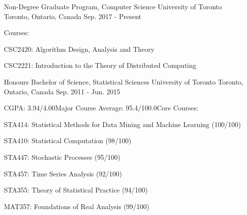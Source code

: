 
\begin{cventries}

  \cventry
    {Non-Degree Graduate Program, Computer Science} %
    {University of Toronto} %
    {Toronto, Ontario, Canada} %
    {Sep. 2017 - Present} %
    {Courses: \newline \hphantom{0}
      \begin{cvitems}
        \item {CSC2420: Algorithm Design, Analysis and Theory}
        \item {CSC2221: Introduction to the Theory of Distributed Computing}
      \end{cvitems}
    }
\end{cventries}
\begin{cventries}
  \cventry
    {Honours Bachelor of Science, Statistical Sciences} %
    {University of Toronto} %
    {Toronto, Ontario, Canada} %
    {Sep. 2011 - Jun. 2015} %
    {CGPA: 3.94/4.00\newline Major Course Average: 95.4/100.0\newline Core Courses: \newline \hphantom{0}
      \begin{cvitems}
        \item {STA414: Statistical Methods for Data Mining and Machine Learning (100/100)}
        \item {STA410: Statistical Computation (98/100)}
        \item {STA447: Stochastic Processes (95/100)}
        \item {STA457: Time Series Analysis (92/100)}
        \item {STA355: Theory of Statistical Practice (94/100)}
        \item {MAT357: Foundations of Real Analysis (99/100)}
      \end{cvitems}
    }
\end{cventries}
